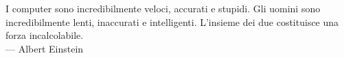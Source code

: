 \cleardoublepage
{}
\thispagestyle{empty}
\vspace*{3cm}

\begin{center}
	I computer sono incredibilmente veloci, accurati e stupidi. Gli uomini sono incredibilmente lenti, inaccurati e intelligenti. L'insieme dei due costituisce una forza incalcolabile. \\ \medskip
--- Albert Einstein    
\end{center}

